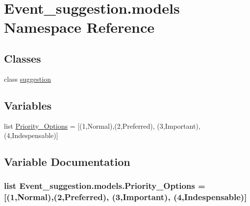 \hypertarget{namespaceEvent__suggestion_1_1models}{}\section{Event\+\_\+suggestion.\+models Namespace Reference}
\label{namespaceEvent__suggestion_1_1models}
\subsection*{Classes}
\begin{DoxyCompactItemize}
\item 
class \hyperlink{classEvent__suggestion_1_1models_1_1suggestion}{suggestion}
\end{DoxyCompactItemize}
\subsection*{Variables}
\begin{DoxyCompactItemize}
\item 
list \hyperlink{namespaceEvent__suggestion_1_1models_a7f9580b95bf99fb8f850c65544f53426}{Priority\+\_\+\+Options} = \mbox{[}(\textquotesingle{}1\textquotesingle{},\textquotesingle{}Normal\textquotesingle{}),(\textquotesingle{}2\textquotesingle{},\textquotesingle{}Preferred\textquotesingle{}), (\textquotesingle{}3\textquotesingle{},\textquotesingle{}Important\textquotesingle{}), (\textquotesingle{}4\textquotesingle{},\textquotesingle{}Indespensable\textquotesingle{})\mbox{]}
\end{DoxyCompactItemize}


\subsection{Variable Documentation}
\subsubsection[{\texorpdfstring{Priority\+\_\+\+Options}{Priority_Options}}]{\setlength{\rightskip}{0pt plus 5cm}list Event\+\_\+suggestion.\+models.\+Priority\+\_\+\+Options = \mbox{[}(\textquotesingle{}1\textquotesingle{},\textquotesingle{}Normal\textquotesingle{}),(\textquotesingle{}2\textquotesingle{},\textquotesingle{}Preferred\textquotesingle{}), (\textquotesingle{}3\textquotesingle{},\textquotesingle{}Important\textquotesingle{}), (\textquotesingle{}4\textquotesingle{},\textquotesingle{}Indespensable\textquotesingle{})\mbox{]}}\hypertarget{namespaceEvent__suggestion_1_1models_a7f9580b95bf99fb8f850c65544f53426}{}\label{namespaceEvent__suggestion_1_1models_a7f9580b95bf99fb8f850c65544f53426}
